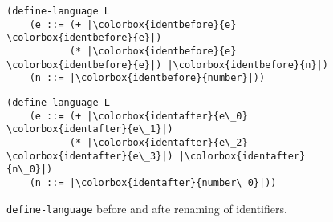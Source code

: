\begin{figure}[h]
	\begin{minipage}{0.5\linewidth}
		\centering
		\begin{verbatim}
(define-language L
	(e ::= (+ |\colorbox{identbefore}{e} \colorbox{identbefore}{e}|)
	       (* |\colorbox{identbefore}{e} \colorbox{identbefore}{e}|) |\colorbox{identbefore}{n}|)
	(n ::= |\colorbox{identbefore}{number}|))
		\end{verbatim}
	\end{minipage}
	\begin{minipage}{0.5\linewidth}
		\centering
		\begin{verbatim}
(define-language L
	(e ::= (+ |\colorbox{identafter}{e\_0} \colorbox{identafter}{e\_1}|)
	       (* |\colorbox{identafter}{e\_2} \colorbox{identafter}{e\_3}|) |\colorbox{identafter}{n\_0}|)
	(n ::= |\colorbox{identafter}{number\_0}|))
		\end{verbatim}
	\end{minipage}
	\caption{\texttt{define-language} before and afte renaming of identifiers.}
	\label{id-rewrite-example}
\end{figure}
